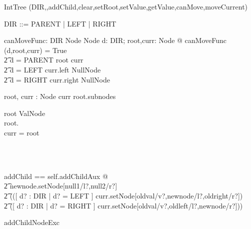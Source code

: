 \begin{class}{IntTree}
\visibility (DIR,\Init,addChild,clear,setRoot,setValue,getValue,canMove,moveCurrent) \\
\begin{zed}
DIR ::= PARENT | LEFT | RIGHT
\end{zed}
\begin{axdef}
	canMoveFunc: DIR \cross Node \cross Node \fun \bool
\where
	\forall d: DIR; root,curr: Node @ canMoveFunc (d,root,curr) = True \iff \\
		\t2 d = PARENT \land root \neq curr \lor \\
		\t2 d = LEFT \land curr.left \notin NullNode \lor \\
		\t2 d = RIGHT \land curr.right \notin NullNode
\end{axdef}
\begin{state}
	root, curr : Node
\where
	curr \in root.subnodes
\end{state}
\begin{init}
	root \in ValNode \\
        root.\Init \\
        curr = root
\end{init}\\
\\
addChild == self.addChildAux @ \\
	\t2 newnode.setNode[null1/l?,null2/r?] \land \\
	\t2 (([ d? : DIR | d? = LEFT ]
		\land curr.setNode[oldval/v?,newnode/l?,oldright/r?]) \gch \\
	\t2 ([ d? : DIR | d? = RIGHT ]
		\land curr.setNode[oldval/v?,oldleft/l?,newnode/r?]))\\
\begin{op}{addChildNodeExc}

\end{op}
\end{class}

